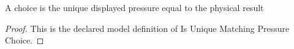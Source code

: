\begin{definition}
  \label{def:physics:phyx-mini-0476:phyxminiproblems-problemphyxmini0476-isuniquematchingpressurechoice}
  A choice is the unique displayed pressure equal to the physical result
\end{definition}
\begin{proof}
  This is the declared model definition of Is Unique Matching Pressure Choice.
\end{proof}
